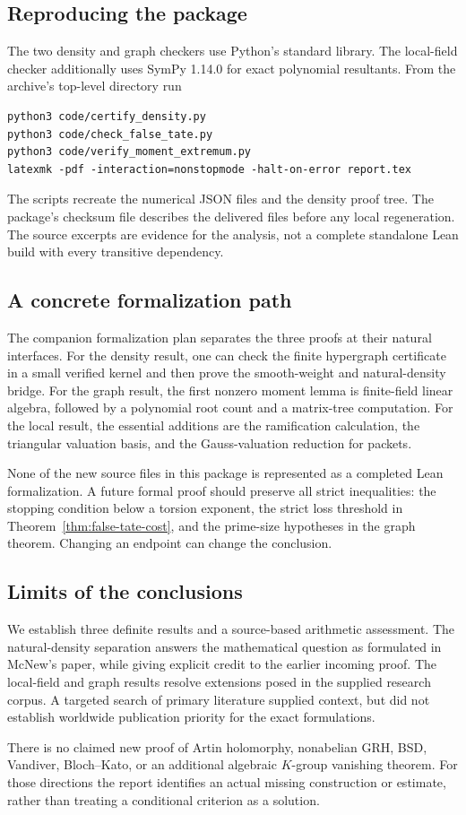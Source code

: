\subsection{Reproducing the package}
The two density and graph checkers use Python's standard library. The
local-field checker additionally uses SymPy 1.14.0 for exact polynomial resultants.
From the archive's top-level directory run
\begin{verbatim}
python3 code/certify_density.py
python3 code/check_false_tate.py
python3 code/verify_moment_extremum.py
latexmk -pdf -interaction=nonstopmode -halt-on-error report.tex
\end{verbatim}
The scripts recreate the numerical JSON files and the density proof tree.
The package's checksum file describes the delivered files before any local
regeneration. The source excerpts are evidence for the analysis, not a complete
standalone Lean build with every transitive dependency.

\subsection{A concrete formalization path}
The companion formalization plan separates the three proofs at their natural
interfaces. For the density result, one can check the finite hypergraph certificate
in a small verified kernel and then prove the smooth-weight and natural-density
bridge. For the graph result, the first nonzero moment lemma is finite-field
linear algebra, followed by a polynomial root count and a matrix-tree computation.
For the local result, the essential additions are the ramification calculation,
the triangular valuation basis, and the Gauss-valuation reduction for packets.

None of the new source files in this package is represented as a completed Lean
formalization. A future formal proof should preserve all strict inequalities:
the stopping condition below a torsion exponent, the strict loss threshold
in Theorem~\ref{thm:false-tate-cost}, and the prime-size hypotheses in the
graph theorem. Changing an endpoint can change the conclusion.

\subsection{Limits of the conclusions}
We establish three definite results and a source-based arithmetic assessment.
The natural-density separation answers the mathematical question as formulated
in McNew's paper, while giving explicit credit to the earlier incoming proof.
The local-field and graph results resolve extensions posed in the supplied
research corpus. A targeted search of primary literature supplied context,
but did not establish worldwide publication priority for the exact formulations.

There is no claimed new proof of Artin holomorphy, nonabelian GRH, BSD,
Vandiver, Bloch--Kato, or an additional algebraic $K$-group vanishing theorem.
For those directions the report identifies an actual missing construction
or estimate, rather than treating a conditional criterion as a solution.
